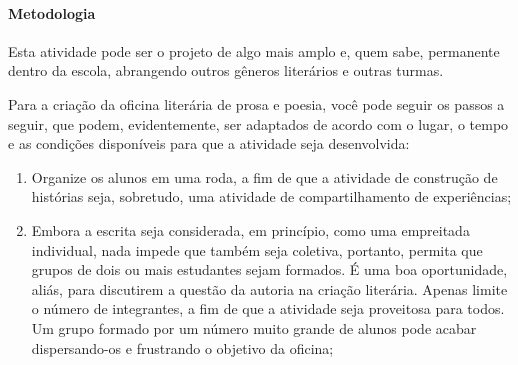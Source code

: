 \documentclass[12pt]{extarticle}
\begin{document}
\paragraph{Metodologia} Esta atividade pode ser o projeto de algo mais
amplo e, quem sabe, permanente dentro da escola, abrangendo outros
gêneros literários e outras turmas.

Para a criação da oficina literária de prosa e poesia, você pode seguir
os passos a seguir, que podem, evidentemente, ser adaptados de acordo
com o lugar, o tempo e as condições disponíveis para que a atividade
seja desenvolvida:

\begin{enumerate}
\item
  Organize os alunos em uma roda, a fim de que a atividade de construção
  de histórias seja, sobretudo, uma atividade de compartilhamento de
  experiências;
\item
  Embora a escrita seja considerada, em princípio, como uma empreitada
  individual, nada impede que também seja coletiva, portanto, permita
  que grupos de dois ou mais estudantes sejam formados. É uma boa
  oportunidade, aliás, para discutirem a questão da autoria na criação
  literária. Apenas limite o número de integrantes, a fim de que a
  atividade seja proveitosa para todos. Um grupo formado por um número
  muito grande de alunos pode acabar dispersando-os e frustrando o
  objetivo da oficina;


\end{enumerate}
\end{document}
